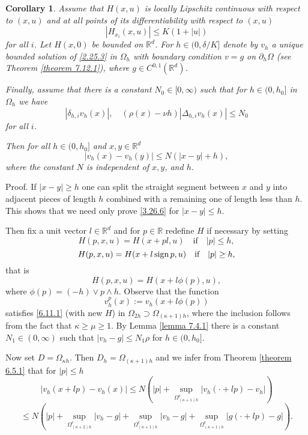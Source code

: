 \documentclass[11pt, reqno]{amsart}
\newtheorem{corollary}[theorem]{Corollary}
\theoremstyle{definition}
\theoremstyle{remark}
\begin{document}
\begin{corollary}
                                       \label{corollary 7.21.1}
Assume that $H(x,u)$ is locally Lipschitz continuous with
respect to $(x,u)$ and at all points of its differentiability
with respect to $(x,u)$
$$
|H_{x_{i}}(x,u)|\leq K(1+|u|)
$$
for all $i$. Let $H(x,0)$ be bounded on ${\mathbb{R}}^{d}$.
For $h\in(0,\delta/K]$ denote by $v_{h}$ a unique
bounded solution of \eqref{2.25.3} in $\Omega_{h}$
with   boundary condition  $v=g$ on $\partial_{h}\Omega$
(see Theorem \ref{theorem 7.12.1}), where $g
\in C^{0,1}({\mathbb{R}}^{d})$.
 
Finally, assume that
there is a constant  $N_{0}\in[0,\infty)$
such that
for   $h\in(0,h_{0}]$ in $\Omega_{h}$ we have
$$
|\delta_{h,i} v_{h}(x)| ,\quad (\rho (x)-\nu h)
|\Delta_{h,i} v_{h}(x)|\leq N_{0}
$$
for all $i$.

 Then for all $h\in(0,h_{0}]$ and  $x,y\in {\mathbb{R}}^{d}$
\begin{equation}
                                                \label{3.26.6}
|v_{h}(x)-v_{h}(y)|\leq N (|x-y|+ h ),
\end{equation}
  where the constant  $N$ is independent
of $x,y$, and $h$.

\end{corollary}

Proof. 
If $|x-y|\geq h$ one can split the straight
segment between
$x$ and $y$ into adjacent pieces of length $h$ combined with
a remaining one of length less than $h$. This shows that
we need only  prove \eqref{3.26.6} for $|x-y|\leq h$.

Then fix a unit vector $l\in{\mathbb{R}}^{d}$ and for $p\in{\mathbb{R}} $
redefine $H$ if necessary by setting
$$
H(p,x,u)=H(x+p l,u)\quad\text{if}\quad |p|\leq h,
$$
$$
H(p,x,u)=H(x+ l \,{\rm sign}\, p,u)\quad\text{if}\quad |p|\geq h,
$$
that is
$$
H(p,x,u)=H(x+  l \phi(p),u),
$$
where $\phi(p)=(-h)\vee p\wedge h$. Observe that the
function
$$
v^{p}_{h}(x):=v_{h}(x+ l \phi(p))
$$
satisfies \eqref{6.11.1} (with new $H$) in $\Omega_{2h}
\supset\Omega_{(\kappa+1) h}$, where the inclusion
follows from the fact that $\kappa\geq\mu\geq1$. 
By Lemma \ref{lemma 7.4.1} there is a
constant  $N_{1} \in(0,\infty)$ such that
  $|v_{h}-g|\leq N_{1}\rho$
for   $h\in(0,h_{0}]$.

Now set $D=\Omega_{\kappa h}$. Then $D_{h}=\Omega_{(\kappa+1) h}$
and
we infer from Theorem \ref{theorem 6.5.1} that
for $|p|\leq h$
$$
|v_{h}(x+ l p)-v _{h}(x)|\leq N(|p|+
 \sup_{ \Omega^{c}_{(\kappa+1) h}}|v_{h}(\cdot+lp)-
v_{h}|)
$$
\begin{equation}
                                                \label{7.21.4}
\leq N( |p|+
  \sup_{ \Omega^{c}_{(\kappa+2) h}}|v_{h}-g|+
\sup_{ \Omega^{c}_{(\kappa+1) h}}|v_{h}-g|
+\sup_{ \Omega^{c}_{(\kappa+1) h}}|g(\cdot+lp)-
g|).
\end{equation}
\end{document}
